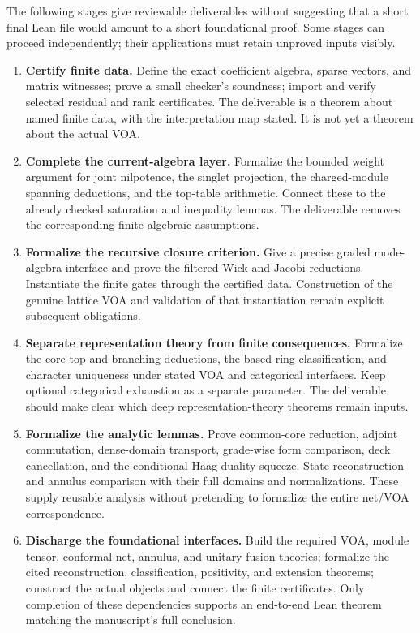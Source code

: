 The following stages give reviewable deliverables without suggesting
that a short final Lean file would amount to a short foundational proof.
Some stages can proceed independently; their applications must retain
unproved inputs visibly.
\begin{enumerate}
\item \textbf{Certify finite data.} Define the exact coefficient algebra,
sparse vectors, and matrix witnesses; prove a small checker's soundness;
import and verify selected residual and rank certificates. The
deliverable is a theorem about named finite data, with the interpretation
map stated. It is not yet a theorem about the actual VOA.
\item \textbf{Complete the current-algebra layer.} Formalize the bounded
weight argument for joint nilpotence, the singlet projection, the
charged-module spanning deductions, and the top-table arithmetic.
Connect these to the already checked saturation and inequality lemmas.
The deliverable removes the corresponding finite algebraic assumptions.
\item \textbf{Formalize the recursive closure criterion.} Give a precise
graded mode-algebra interface and prove the filtered Wick and Jacobi
reductions. Instantiate the finite gates through the certified data.
Construction of the genuine lattice VOA and validation of that
instantiation remain explicit subsequent obligations.
\item \textbf{Separate representation theory from finite consequences.}
Formalize the core-top and branching deductions, the based-ring
classification, and character uniqueness under stated VOA and
categorical interfaces. Keep optional categorical exhaustion as a
separate parameter. The deliverable should make clear which deep
representation-theory theorems remain inputs.
\item \textbf{Formalize the analytic lemmas.} Prove common-core reduction,
adjoint commutation, dense-domain transport, grade-wise form comparison,
deck cancellation, and the conditional Haag-duality squeeze. State
reconstruction and annulus comparison with their full domains and
normalizations. These supply reusable analysis without pretending to
formalize the entire net/VOA correspondence.
\item \textbf{Discharge the foundational interfaces.} Build the required
VOA, module tensor, conformal-net, annulus, and unitary fusion theories;
formalize the cited reconstruction, classification, positivity, and
extension theorems; construct the actual objects and connect the finite
certificates. Only completion of these dependencies supports an
end-to-end Lean theorem matching the manuscript's full conclusion.
\end{enumerate}

